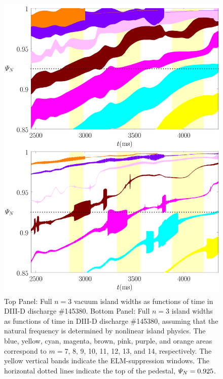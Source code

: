\documentclass[12pt,prb,aps]{revtex4-1}
\begin{document}
\begin{figure}
\includegraphics[height=6in]{fig6.pdf}
\caption{Top Panel: Full  $n=3$ vacuum island widths as functions of time
in   DIII-D discharge \#145380.
Bottom Panel:  Full $n=3$ island widths as functions of time
in   DIII-D discharge \#145380, assuming that the natural frequency is determined by nonlinear island physics. The blue, yellow, cyan, magenta, brown, pink,
purple, and orange  areas correspond to $m=7$, 8, 9, 10, 11, 12, 13, and 14, respectively. The yellow vertical bands indicate the ELM-suppression windows. 
The horizontal dotted lines indicate the top of the pedestal, ${\mit\Psi}_N=0.925$.} \label{fig6}
\end{figure}
\end{document}
